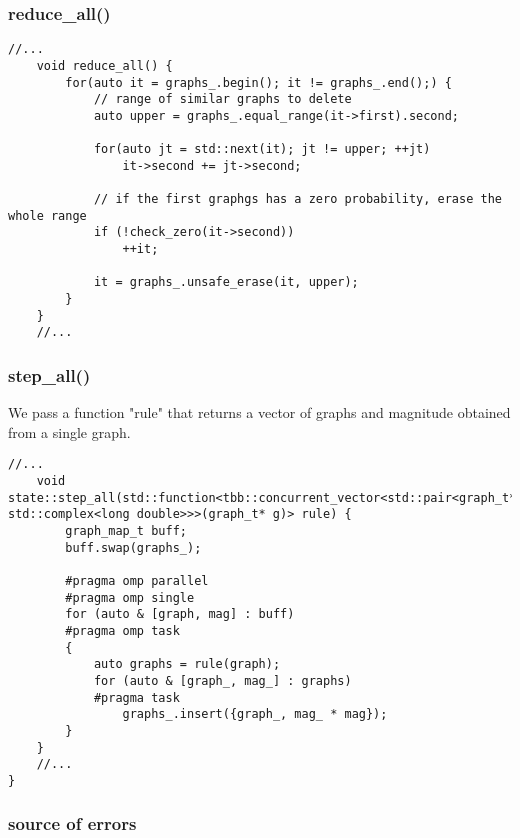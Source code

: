 \documentclass[11pt]{article}
\begin{document}
\subsubsection{reduce\_all()}

\begin{lstlisting}[style=CStyle]
	//...
	void reduce_all() {
		for(auto it = graphs_.begin(); it != graphs_.end();) {
			// range of similar graphs to delete
			auto upper = graphs_.equal_range(it->first).second;

			for(auto jt = std::next(it); jt != upper; ++jt)
		    	it->second += jt->second;

			// if the first graphgs has a zero probability, erase the whole range
			if (!check_zero(it->second))
				++it;
			
			it = graphs_.unsafe_erase(it, upper);
		}
	}
	//...
\end{lstlisting}

\subsubsection{step\_all()}

We pass a function "rule" that returns a vector of graphs and magnitude obtained from a single graph.

\begin{lstlisting}[style=CStyle]
	//...
	void state::step_all(std::function<tbb::concurrent_vector<std::pair<graph_t*, std::complex<long double>>>(graph_t* g)> rule) {
		graph_map_t buff;
		buff.swap(graphs_);

		#pragma omp parallel
		#pragma omp single
		for (auto & [graph, mag] : buff)
		#pragma omp task
		{
			auto graphs = rule(graph);
			for (auto & [graph_, mag_] : graphs)
			#pragma task
	  			graphs_.insert({graph_, mag_ * mag});
		}
	}
	//...
}
\end{lstlisting}

\subsubsection{source of errors}
\end{document}
